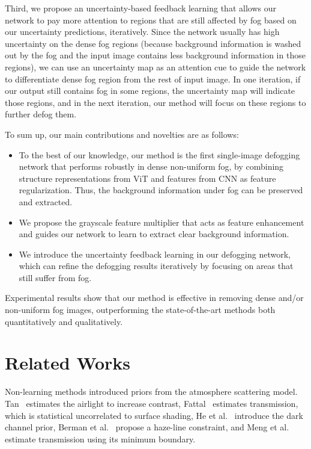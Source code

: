 \documentclass[runningheads]{llncs}
\begin{document}
Third, we propose an uncertainty-based feedback learning that allows our network to pay more attention to regions that are still affected by fog based on our uncertainty predictions, iteratively.
Since the network usually has high uncertainty on the dense fog regions (because background information is washed out by the fog and the input image contains less background information in those regions), we can use an uncertainty map as an attention cue to guide the network to differentiate dense fog region from the rest of input image.
In one iteration, if our output still contains fog in some regions, the uncertainty map will indicate those regions, and in the next iteration, our method will focus on these regions to further defog them.

To sum up, our main contributions and novelties are as follows:
\begin{itemize}[noitemsep,topsep=1pt]
	\item 
	To the best of our knowledge, our method is the first single-image defogging network that performs robustly in dense non-uniform fog, by combining structure representations from ViT and features from CNN as feature regularization. Thus, the background information under fog can be preserved and extracted.
	\item
	We propose the grayscale feature multiplier that acts as feature enhancement and guides our network to learn to extract clear background information.
	\item 
	We introduce the uncertainty feedback learning in our defogging network, which can refine the defogging results iteratively by focusing on areas that still suffer from fog.
\end{itemize}
Experimental results show that our method is effective in removing dense and/or non-uniform fog images, outperforming the state-of-the-art methods both quantitatively and qualitatively.


\section{Related Works}
\label{sec:related}
Non-learning methods introduced priors from the atmosphere scattering model.
Tan~\cite{tan2008visibility} estimates the airlight to increase contrast, 
Fattal~\cite{fattal2008single} estimates transmission, which is statistical uncorrelated to surface shading,
He et al.~\cite{he2010single} introduce the dark channel prior, 
Berman et al.~\cite{berman2018single} propose a haze-line constraint,
and Meng et al.~\cite{meng2013efficient} estimate transmission using its minimum boundary. 
\end{document}
